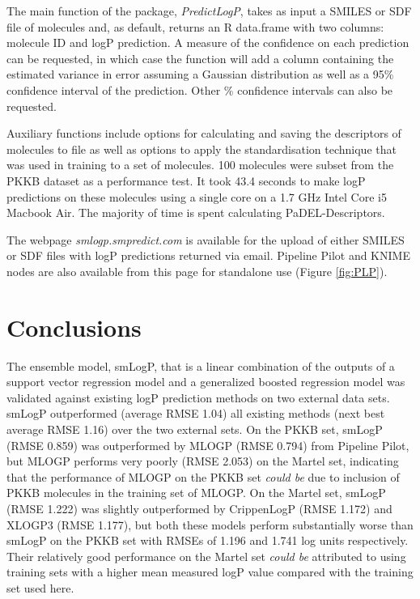 \documentclass[10pt]{bmc_article}
\newenvironment{bmcformat}{\begin{raggedright}\baselineskip20pt\sloppy\setboolean{publ}{false}}{\end{raggedright}\baselineskip20pt\sloppy}
\begin{document}
\begin{bmcformat}
The main function of the package, \textit{PredictLogP}, takes as input a SMILES or SDF file of molecules and, as default, returns an R data.frame with two columns: molecule ID and logP prediction. A measure of the confidence on each prediction can be requested, in which case the function will add a column containing the estimated variance in error assuming a Gaussian distribution as well as a 95\% confidence interval of the prediction. Other \% confidence intervals can also be requested.

Auxiliary functions include options for calculating and saving the descriptors of molecules to file as well as options to apply the standardisation technique that was used in training to a set of molecules. 100 molecules were subset from the PKKB dataset as a performance test. It took 43.4 seconds to make logP predictions on these molecules using a single core on a 1.7 GHz Intel Core i5 Macbook Air. The majority of time is spent calculating PaDEL-Descriptors.  

The webpage \textit{smlogp.smpredict.com} is available for the upload of either SMILES or SDF files with logP predictions returned via email. Pipeline Pilot and KNIME nodes are also available from this page for standalone use (Figure \ref{fig:PLP}).    

\section*{Conclusions}

The ensemble model, smLogP, that is a linear combination of the outputs of a support vector regression model and a generalized boosted regression model was validated against existing logP prediction methods on two external data sets. smLogP outperformed (average RMSE 1.04) all existing methods (next best average RMSE 1.16) over the two external sets. On the PKKB set, smLogP (RMSE 0.859)  was outperformed by MLOGP (RMSE 0.794) from Pipeline Pilot, but MLOGP performs very poorly (RMSE 2.053) on the Martel set, indicating that the performance of MLOGP on the PKKB set \textit{could be} due to inclusion of PKKB molecules in the training set of MLOGP. On the Martel set, smLogP (RMSE 1.222) was slightly outperformed by CrippenLogP (RMSE 1.172) and XLOGP3 (RMSE 1.177), but both these models perform substantially worse than smLogP on the PKKB set with RMSEs of 1.196 and 1.741 log units respectively. Their relatively good performance on the Martel set \textit{could be} attributed to using training sets with a higher mean measured logP value compared with the training set used here.


\end{bmcformat}
\end{document}
